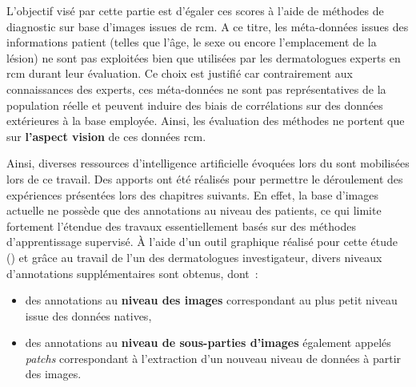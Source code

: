 L'objectif visé par cette partie est d'égaler ces scores à l'aide de méthodes de diagnostic sur base d'images issues de \gls{rcm}. A ce titre, les méta-données issues des informations patient (telles que l'âge, le sexe ou encore l'emplacement de la lésion) ne sont pas exploitées bien que utilisées par les dermatologues experts en \gls{rcm} durant leur évaluation. Ce choix est justifié car contrairement aux connaissances des experts, ces méta-données ne sont pas représentatives de la population réelle et peuvent induire des biais de corrélations sur des données extérieures à la base employée. Ainsi, les évaluation des méthodes ne portent que sur \textbf{l'aspect vision} de ces données \gls{rcm}.\par

Ainsi, diverses ressources d'intelligence artificielle évoquées lors du  sont mobilisées lors de ce travail. Des apports ont été réalisés pour permettre le déroulement des expériences présentées lors des chapitres suivants. En effet, la base d'images actuelle ne possède que des annotations au niveau des patients, ce qui limite fortement l'étendue des travaux essentiellement basés sur des méthodes d'apprentissage supervisé. À l'aide d'un outil graphique réalisé pour cette étude () et grâce au travail de l'un des dermatologues investigateur, divers niveaux d'annotations supplémentaires sont obtenus, dont~:
\begin{itemize}
    \item des annotations au \textbf{niveau des images} correspondant au plus petit niveau issue des données natives,
    \item des annotations au \textbf{niveau de sous-parties d'images} également appelés \textit{patchs} correspondant à l'extraction d'un nouveau niveau de données à partir des images.
\end{itemize}\par
\clearpage

